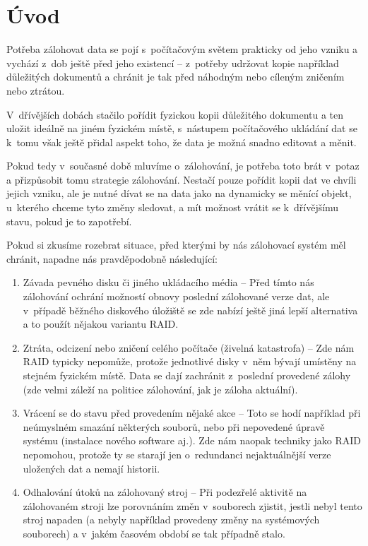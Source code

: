 \chapter*{Úvod}

Potřeba zálohovat data se pojí s~počítačovým světem prakticky od jeho vzniku
a vychází z~dob ještě před jeho existencí -- z~potřeby udržovat kopie například
důležitých dokumentů a chránit je tak před náhodným nebo cíleným zničením nebo
ztrátou.

V~dřívějších dobách stačilo pořídit fyzickou kopii důležitého dokumentu a ten
uložit ideálně na jiném fyzickém místě, s~nástupem počítačového ukládání dat se
k~tomu však ještě přidal aspekt toho, že data je možná snadno editovat a měnit.

Pokud tedy v~současné době mluvíme o~zálohování, je potřeba toto brát v~potaz
a přizpůsobit tomu strategie zálohování. Nestačí pouze pořídit kopii dat ve
chvíli jejich vzniku, ale je nutné dívat se na data jako na dynamicky se měnící
objekt, u~kterého chceme tyto změny sledovat, a mít možnost vrátit se
k~dřívějšímu stavu, pokud je to zapotřebí.

Pokud si zkusíme rozebrat situace, před kterými by nás zálohovací systém měl
chránit, napadne nás pravděpodobně následující:


\begin{enumerate}
	\item Závada pevného disku či jiného ukládacího média -- Před tímto nás
	zálohování ochrání možností obnovy poslední zálohované verze dat, ale
	v~případě běžného diskového úložiště se zde nabízí ještě jiná lepší
	alternativa a to použít nějakou variantu \gls{RAID}.
	\item Ztráta, odcizení nebo zničení celého počítače (živelná katastrofa)
	-- Zde nám \gls{RAID} typicky nepomůže, protože jednotlivé disky v~něm
	bývají umístěny na stejném fyzickém místě. Data se dají zachránit
	z~poslední provedené zálohy (zde velmi záleží na politice zálohování,
	jak je záloha aktuální).
	\item Vrácení se do stavu před provedením nějaké akce -- Toto se hodí
	například při neúmyslném smazání některých souborů, nebo při nepovedené
	úpravě systému (instalace nového software aj.). Zde nám naopak techniky
	jako \gls{RAID} nepomohou, protože ty se starají jen o~redundanci
	nejaktuálnější verze uložených dat a nemají historii.
	\item Odhalování útoků na zálohovaný stroj -- Při podezřelé aktivitě na
	zálohovaném stroji lze porovnáním změn v~souborech zjistit, jestli nebyl
	tento stroj napaden (a nebyly například provedeny změny na systémových
	souborech) a v~jakém časovém období se tak případně stalo.
\end{enumerate}

